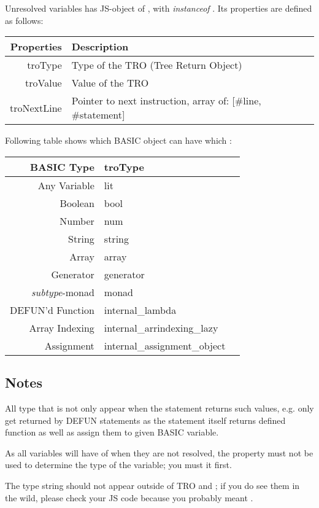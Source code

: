 Unresolved variables has JS-object of , with \emph{instanceof} . Its properties are defined as follows:

\begin{tabulary}{\textwidth}{RL}
Properties & Description \\
\hline
{\ttfamily troType} & Type of the TRO (Tree Return Object) \\
{\ttfamily troValue} & Value of the TRO \\
{\ttfamily troNextLine} & Pointer to next instruction, array of: [\#line, \#statement] \\
\end{tabulary}

Following table shows which BASIC object can have which :

\begin{tabulary}{\textwidth}{RLL}
BASIC Type & troType \\
\hline
Any Variable & {\ttfamily lit} \\
Boolean & {\ttfamily bool} \\
Number & {\ttfamily num} \\
String & {\ttfamily string} \\
Array & {\ttfamily array} \\
Generator & {\ttfamily generator} \\
\emph{subtype}-monad & {\ttfamily monad} \\
DEFUN'd Function & {\ttfamily internal\_lambda} \\
Array Indexing & {\ttfamily internal\_arrindexing\_lazy} \\
Assignment & {\ttfamily internal\_assignment\_object} \\
\end{tabulary}

\subsection*{Notes}
\begin{itemlist}
\item All type that is not  only appear when the statement returns such values, e.g.  only get returned by DEFUN statements as the statement itself returns defined function as well as assign them to given BASIC variable.
\item As all variables will have  of  when they are not resolved, the property must not be used to determine the type of the variable; you must  it first.
\item The type string  should not appear outside of TRO and ; if you do see them in the wild, please check your JS code because you probably meant .
\end{itemlist}

